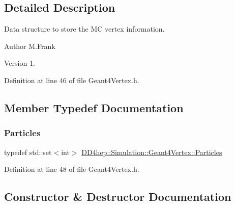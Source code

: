 \subsection{Detailed Description}
Data structure to store the MC vertex information. 

\begin{DoxyAuthor}{Author}
M.\+Frank 
\end{DoxyAuthor}
\begin{DoxyVersion}{Version}
1. 
\end{DoxyVersion}


Definition at line 46 of file Geant4\+Vertex.\+h.



\subsection{Member Typedef Documentation}
\hypertarget{class_d_d4hep_1_1_simulation_1_1_geant4_vertex_a7a0331b96dfa8ff9b4a802caa8dd031c}{}\label{class_d_d4hep_1_1_simulation_1_1_geant4_vertex_a7a0331b96dfa8ff9b4a802caa8dd031c} 
\subsubsection{\texorpdfstring{Particles}{Particles}}
{\footnotesize\ttfamily typedef std\+::set$<$int$>$ \hyperlink{class_d_d4hep_1_1_simulation_1_1_geant4_vertex_a7a0331b96dfa8ff9b4a802caa8dd031c}{D\+D4hep\+::\+Simulation\+::\+Geant4\+Vertex\+::\+Particles}}



Definition at line 48 of file Geant4\+Vertex.\+h.



\subsection{Constructor \& Destructor Documentation}
\hypertarget{class_d_d4hep_1_1_simulation_1_1_geant4_vertex_a6c266fa18efd7d4976c36074856c8bc4}{}\label{class_d_d4hep_1_1_simulation_1_1_geant4_vertex_a6c266fa18efd7d4976c36074856c8bc4} 
